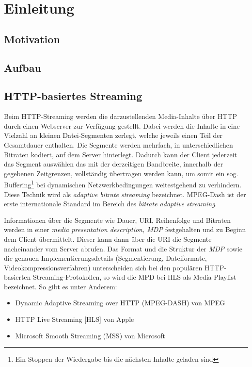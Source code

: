 
\section{Einleitung}
\label{sec:einleitung}

\subsection{Motivation}
\label{subsec:motivation}

\subsection{Aufbau}
\label{subsec:aufbau}
\subsection{HTTP-basiertes Streaming}
\label{subsec:HttpBasiertesLiveStreaming}
Beim HTTP-Streaming werden die darzustellenden Media-Inhalte über HTTP durch einen Webserver zur Verfügung gestellt.
Dabei werden die Inhalte in eine Vielzahl an kleinen Datei-Segmenten zerlegt, welche jeweils einen Teil der Gesamtdauer enthalten.
Die Segmente werden mehrfach, in unterschiedlichen Bitraten kodiert, auf dem Server hinterlegt.
Dadurch kann der Client jederzeit das Segment auswählen das mit der derzeitigen Bandbreite, innerhalb der gegebenen Zeitgrenzen, vollständig übertragen werden kann,
um somit ein sog.
Buffering\footnote{Ein Stoppen der Wiedergabe bis die nächsten Inhalte geladen sind} bei dynamischen Netzwerkbedingungen weitestgehend zu verhindern.
Diese Technik wird als \textit{adaptive bitrate streaming} bezeichnet\parencite{Sodagar2011}\parencite{Sodagar2012Paper}.
MPEG-Dash ist der erste internationale Standard im Bereich des \textit{bitrate adaptive streaming}\parencite{MPEG2011}.

Informationen über die Segmente wie Dauer, URI, Reihenfolge und Bitraten werden in einer \textit{media presentation description, MDP} festgehalten und zu Beginn dem
Client übermittelt.\parencite[Seite 3]{Pantos2020}
Dieser kann dann über die URI die Segmente nacheinander vom Server abrufen.
Das Format und die Struktur der \textit{MDP} sowie die genauen Implementierungsdetails (Segmentierung, Dateiformate, Videokompressionsverfahren) unterscheiden
sich bei den populären HTTP-basierten Streaming-Protokollen, so wird die MPD bei HLS als Media Playlist bezeichnet\parencite{Pantos2020}.
So gibt es unter Anderem:
\begin{itemize}
    \item Dynamic Adaptive Streaming over HTTP (MPEG-DASH) von MPEG
    \item HTTP Live Streaming [HLS] von Apple
    \item Microsoft Smooth Streaming (MSS) von Microsoft
\end{itemize}


